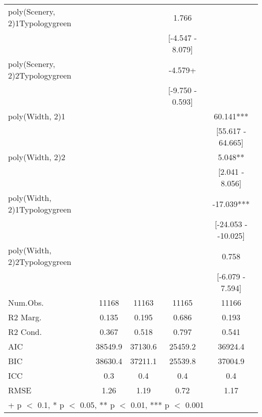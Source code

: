 \begin{table}
\begin{tabular}[t]{lcccc}
poly(Scenery, 2)1Typologygreen &  &  & 1.766 & \\
 &  &  & {}[-4.547 - 8.079] & \\
poly(Scenery, 2)2Typologygreen &  &  & -4.579+ & \\
 &  &  & {}[-9.750 - 0.593] & \\
poly(Width, 2)1 &  &  &  & 60.141***\\
 &  &  &  & {}[55.617 - 64.665]\\
poly(Width, 2)2 &  &  &  & 5.048**\\
 &  &  &  & {}[2.041 - 8.056]\\
poly(Width, 2)1Typologygreen &  &  &  & -17.039***\\
 &  &  &  & {}[-24.053 - -10.025]\\
poly(Width, 2)2Typologygreen &  &  &  & 0.758\\
 &  &  &  & {}[-6.079 - 7.594]\\
\midrule
Num.Obs. & 11168 & 11163 & 11165 & 11166\\
R2 Marg. & 0.135 & 0.195 & 0.686 & 0.193\\
R2 Cond. & 0.367 & 0.518 & 0.797 & 0.541\\
AIC & 38549.9 & 37130.6 & 25459.2 & 36924.4\\
BIC & 38630.4 & 37211.1 & 25539.8 & 37004.9\\
ICC & 0.3 & 0.4 & 0.4 & 0.4\\
RMSE & 1.26 & 1.19 & 0.72 & 1.17\\
\bottomrule
\multicolumn{5}{l}{\rule{0pt}{1em}+ p $<$ 0.1, * p $<$ 0.05, ** p $<$ 0.01, *** p $<$ 0.001}\\
\end{tabular}
\end{table}

